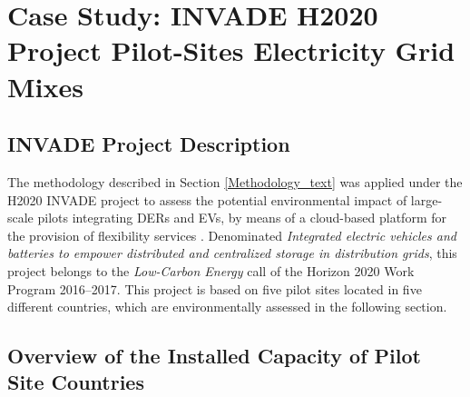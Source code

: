 \section{Case Study: INVADE H2020 Project Pilot-Sites Electricity Grid Mixes} \label{CaseStudy}
\subsection{INVADE Project Description}

The methodology described in Section \ref{Methodology_text} was applied under the H2020 INVADE project to assess the potential environmental impact of large-scale pilots integrating DERs and EVs, by means of a cloud-based platform for {the provision of flexibility services}%
. Denominated \textit{Integrated electric vehicles and batteries to empower distributed and centralized storage in distribution grids}, this project belongs to the  \textit{Low-Carbon Energy} call of the Horizon 2020 Work Program 2016--2017. This project is based on five pilot sites located in five different countries, which are  environmentally assessed in the following section.  %

\subsection{Overview of the Installed Capacity of Pilot Site Countries} 

